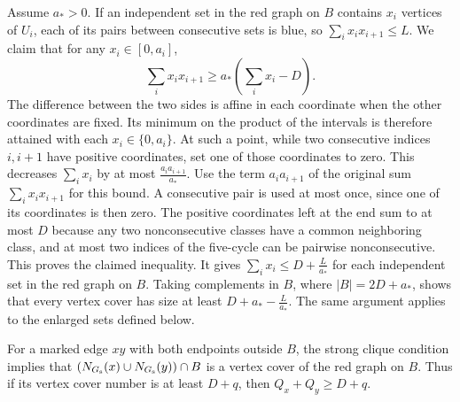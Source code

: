 \documentclass[preprint,11pt,numbers]{elsarticle-arxiv}
\numberwithin{equation}{section}
\theoremstyle{definition}
\begin{document}
Assume $a_*>0$. If an independent set in the red graph on $B$
contains $x_i$ vertices of $U_i$, each of its pairs between
consecutive sets is blue, so $\sum_i x_i x_{i+1}\le L$. We claim
that for any $x_i\in[0,a_i]$,
\[
 \sum_i x_i x_{i+1}\ge a_*\left(\sum_i x_i-D\right).
\]
The difference between the two sides is affine in each coordinate
when the other coordinates are fixed. Its minimum on the product of
the intervals is therefore attained with each $x_i\in\{0,a_i\}$.
At such a point, while two consecutive indices $i,i+1$ have positive
coordinates, set one of those coordinates to zero. This decreases
$\sum_i x_i$ by at most $\frac{a_i a_{i+1}}{a_*}$. Use the term
$a_i a_{i+1}$ of the original sum $\sum_i x_i x_{i+1}$ for this
bound. A consecutive pair is used at most once, since one of its
coordinates is then zero. The positive coordinates left at the end
sum to at most $D$ because any two nonconsecutive classes have a
common neighboring class, and at most two indices of the five-cycle
can be pairwise nonconsecutive. This proves the claimed inequality.
It gives $\sum_i x_i\le D+\frac{L}{a_*}$ for each independent set
in the red graph on $B$. Taking complements in $B$, where
$|B|=2D+a_*$, shows that every vertex cover has size at least
$D+a_*-\frac{L}{a_*}$. The same argument applies to the enlarged sets
defined below.

For a marked edge $xy$ with both endpoints outside $B$, the
strong clique condition implies that
$(N_{G_{\rm s}}(x)\cup N_{G_{\rm s}}(y))\cap B$ is a vertex cover
of the red graph on $B$. Thus if its vertex cover number is at least
$D+q$, then $Q_x+Q_y\ge D+q$.
\end{document}
